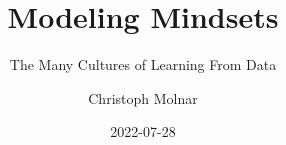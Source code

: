 \documentclass[
  10pt,
]{scrbook}
\title{Modeling Mindsets}
\subtitle{The Many Cultures of Learning From Data}
\author{Christoph Molnar}
\date{2022-07-28}
\begin{document}
\maketitle

\let\oldhref\href
\renewcommand{\href}[2]{#2\footnote{\url{#1}}}




\thispagestyle{empty}

\end{document}
